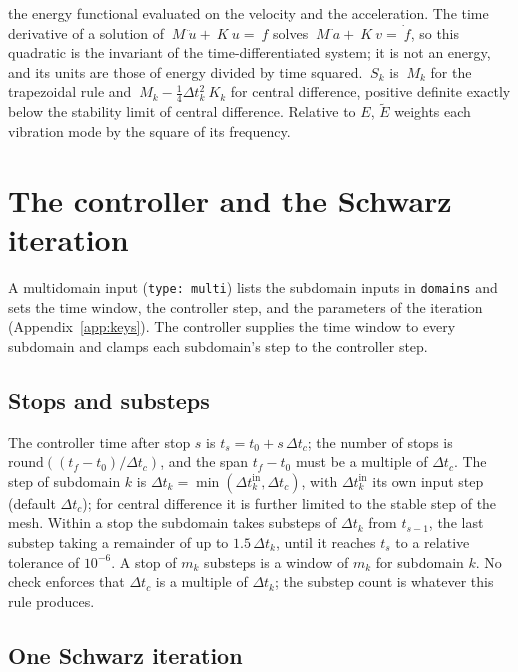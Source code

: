 \documentclass[11pt]{article}
\newcommand{\code}[1]{\texttt{#1}}
\begin{document}
the energy functional evaluated on the velocity and the acceleration. The
time derivative of a solution of $~M \ddot{~u} + ~K ~u = ~f$ solves
$~M \dot{~a} + ~K ~v = \dot{~f}$, so this quadratic is the invariant of the
time-differentiated system; it is not an energy, and its units are those of
energy divided by time squared. $~S_k$ is $~M_k$ for the trapezoidal rule and
$~M_k - \tfrac14 \Delta t_k^2 ~K_k$ for central difference, positive
definite exactly below the stability limit of central difference. Relative
to $E$, $\tilde{E}$ weights each vibration mode by the square of its
frequency.

\section{The controller and the Schwarz iteration}
\label{sec:controller}

A multidomain input (\code{type: multi}) lists the subdomain inputs in
\code{domains} and sets the time window, the controller step, and the
parameters of the iteration (Appendix~\ref{app:keys}). The controller
supplies the time window to every subdomain and clamps each subdomain's
step to the controller step.

\subsection{Stops and substeps}
\label{sec:stops}

The controller time after stop $s$ is $t_s = t_0 + s\,\Delta t_c$; the
number of stops is $\mathrm{round}((t_f - t_0)/\Delta t_c)$, and the span
$t_f - t_0$ must be a multiple of $\Delta t_c$. The step of subdomain $k$ is
$\Delta t_k = \min(\Delta t_k^{\mathrm{in}}, \Delta t_c)$, with
$\Delta t_k^{\mathrm{in}}$ its own input step (default $\Delta t_c$); for
central difference it is further limited to the stable step of the mesh.
Within a stop the subdomain takes substeps of $\Delta t_k$ from $t_{s-1}$,
the last substep taking a remainder of up to $1.5\,\Delta t_k$, until it
reaches $t_s$ to a relative tolerance of $10^{-6}$. A stop of $m_k$
substeps is a window of $m_k$ for subdomain $k$. No check enforces that
$\Delta t_c$ is a multiple of $\Delta t_k$; the substep count is whatever
this rule produces.

\subsection{One Schwarz iteration}
\label{sec:iteration}
\end{document}
